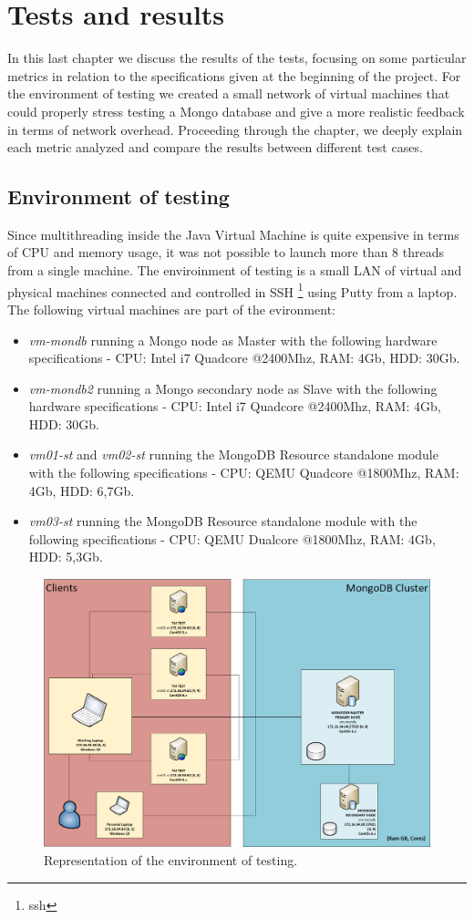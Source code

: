 \chapter{Tests and results}
\label{cha:4}
In this last chapter we discuss the results of the tests, focusing on some particular metrics in relation to the specifications given at the beginning of the project. For the environment of testing we created a small network of virtual machines that could properly stress testing a Mongo database and give a more realistic feedback in terms of network overhead.
Proceeding through the chapter, we deeply explain each metric analyzed and compare the results between different test cases.

\section{Environment of testing}
\label{sec:1}
Since multithreading inside the Java Virtual Machine is quite expensive in terms of CPU and memory usage, it was not possible to launch more than 8 threads from a single machine. 
The enviroinment of testing is a small LAN of virtual and physical machines connected and controlled in SSH \footnote{ssh} using Putty from a laptop.
The following virtual machines are part of the evironment: 
\begin{itemize}
	\item \textit{vm-mondb} running a Mongo node as Master with the following hardware specifications - CPU: Intel i7 Quadcore @2400Mhz, RAM: 4Gb, HDD: 30Gb.
	\item \textit{vm-mondb2} running a Mongo secondary node as Slave with the following hardware specifications - CPU: Intel i7 Quadcore @2400Mhz, RAM: 4Gb, HDD: 30Gb.
	\item \textit{vm01-st} and \textit{vm02-st} running the MongoDB Resource standalone module with the following specifications - CPU: QEMU Quadcore @1800Mhz, RAM: 4Gb, HDD: 6,7Gb.
	\item \textit{vm03-st} running the MongoDB Resource standalone module with the following specifications - CPU: QEMU Dualcore @1800Mhz, RAM: 4Gb, HDD: 5,3Gb.
\end{itemize}
\begin{figure}[H]
\includegraphics[scale=0.5]{my_architecture.png}
\centering
\caption{Representation of the environment of testing.}
\end{figure}

